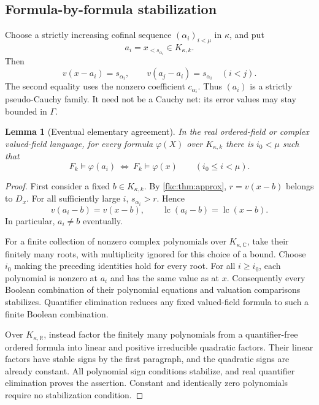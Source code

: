 \documentclass[11pt,letterpaper]{article}
\numberwithin{equation}{section}
\newtheorem{lemma}[theorem]{Lemma}
\theoremstyle{definition}
\theoremstyle{remark}
\newcommand{\R}{\mathbb R}
\newcommand{\C}{\mathbb C}
\newcommand{\lc}{\operatorname{lc}}
\newcommand{\K}{K_{\kappa,k}}
\newcommand{\KR}{K_{\kappa,\R}}
\newcommand{\KC}{K_{\kappa,\C}}
\begin{document}
\subsection{Formula-by-formula stabilization}
Choose a strictly increasing cofinal sequence $(\alpha_i)_{i<\mu}$ in $\kappa$, and put
\begin{equation}\label{fkc:eq:approximants}
 a_i=x_{<s_{\alpha_i}}\in\K.
\end{equation}
Then
\begin{equation}\label{fkc:eq:approx-errors}
 v(x-a_i)=s_{\alpha_i},\qquad
 v(a_j-a_i)=s_{\alpha_i}\quad(i<j).
\end{equation}
The second equality uses the nonzero coefficient $c_{\alpha_i}$. Thus $(a_i)$ is a strictly pseudo-Cauchy family. It need not be a Cauchy net: its error values may stay bounded in $\Gamma$.

\begin{lemma}[Eventual elementary agreement]\label{fkc:lem:stabilize}
In the real ordered-field or complex valued-field language, for every formula $\varphi(X)$ over $\K$ there is $i_0<\mu$ such that
\[
 F_k\models\varphi(a_i)\ \Longleftrightarrow\ F_k\models\varphi(x)
 \qquad(i_0\le i<\mu).
\]
\end{lemma}
\begin{proof}
First consider a fixed $b\in\K$. By \cref{fkc:thm:approx}, $r=v(x-b)$ belongs to $D_x$. For all sufficiently large $i$, $s_{\alpha_i}>r$. Hence
\[
 v(a_i-b)=v(x-b),\qquad \lc(a_i-b)=\lc(x-b).
\]
In particular, $a_i\ne b$ eventually.

For a finite collection of nonzero complex polynomials over $\KC$, take their finitely many roots, with multiplicity ignored for this choice of a bound. Choose $i_0$ making the preceding identities hold for every root. For all $i\ge i_0$, each polynomial is nonzero at $a_i$ and has the same value as at $x$. Consequently every Boolean combination of their polynomial equations and valuation comparisons stabilizes. Quantifier elimination reduces any fixed valued-field formula to such a finite Boolean combination.

Over $\KR$, instead factor the finitely many polynomials from a quantifier-free ordered formula into linear and positive irreducible quadratic factors. Their linear factors have stable signs by the first paragraph, and the quadratic signs are already constant. All polynomial sign conditions stabilize, and real quantifier elimination proves the assertion. Constant and identically zero polynomials require no stabilization condition.
\end{proof}
\end{document}
